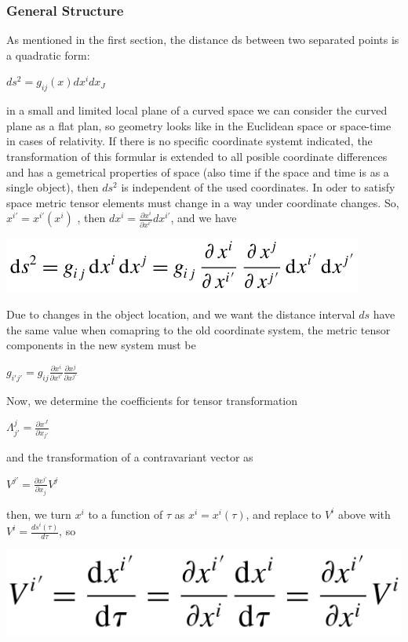 \documentclass[11pt,a4paper]{article}
\begin{document}
	\subsubsection{General Structure }
	As mentioned in the first section, the distance ds between two separated points is a quadratic form:
	\begin{center}
		$ds^2 = g_{ij} (x)dx^i dx_J$
	\end{center}
	in a small and limited local plane of a curved space we can consider the curved plane as a flat plan, so  geometry looks like in the Euclidean space or space-time in cases of relativity.  If there is no specific coordinate systemt indicated, the transformation of this formular is extended to all posible coordinate differences and has a gemetrical properties of space (also time if the space and time is as a single object), then  $ds^2$ is independent of the used coordinates. In oder to satisfy space metric tensor elements must change in a way under coordinate changes. So, $x^{i'} = x^{i'}(x^i)$ , then  $dx^i = \frac{\partial x^i}{\partial x^{i'}} dx^{i'}$, and we have
	\begin{center}
		\includegraphics[scale=0.4,alt={coordinate change}]{./rie_chang_1.png}
	\end{center}
	Due to changes in the object location, and we want the distance interval  $ds$ have the same value when comapring to the old coordinate system,  the metric tensor components in the new system must be
	\begin{center}
		$g_{i'j'} = g_{ij} \frac{\partial x^i}{\partial x^{i'}} \frac{\partial x^j}{\partial x^{j'}} $
	\end{center}
	Now, we determine the coefficients for tensor transformation 
	\begin{center}
		$\Lambda^{j}_{j'} = \frac{\partial x^J}{\partial x_{j'}}$
	\end{center}
	and the transformation of  a contravariant vector as
	\begin{center}
		$V^{j'} = \frac{\partial x^{j'}}{\partial x_{j}} V^j$
	\end{center}
	then, we turn $x^i $ to a function of $\tau$ as $x^i = x^i (\tau)$, and replace to $V^i$ above with $V^i = \frac{ds^i(\tau)}{d\tau}$, so 
	\begin{center}
		\includegraphics[scale=0.2]{./Vi_diff.png}
	\end{center}
\end{document}
